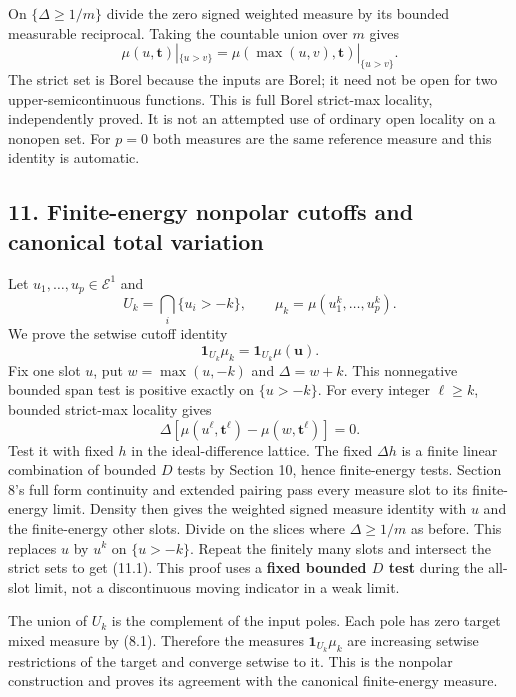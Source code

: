 \documentclass[
]{article}
\begin{document}
On \(\{\Delta\ge1/m\}\) divide the zero signed weighted measure by its
bounded measurable reciprocal. Taking the countable union over \(m\)
gives
\[\mu(u,\boldsymbol t)|_{\{u>v\}}=\mu(\max(u,v),\boldsymbol t)|_{\{u>v\}}.\tag{10.2}\]
The strict set is Borel because the inputs are Borel; it need not be
open for two upper-semicontinuous functions. This is full Borel
strict-max locality, independently proved. It is not an attempted use of
ordinary open locality on a nonopen set. For \(p=0\) both measures are
the same reference measure and this identity is automatic.

\subsection{11. Finite-energy nonpolar cutoffs and canonical total
variation}\label{finite-energy-nonpolar-cutoffs-and-canonical-total-variation}

Let \(u_1,\ldots,u_p\in\mathcal E^1\) and
\[U_k=\bigcap_i\{u_i>-k\},\qquad \mu_k=\mu(u_1^k,\ldots,u_p^k).\] We
prove the setwise cutoff identity
\[\mathbf1_{U_k}\mu_k=\mathbf1_{U_k}\mu(\boldsymbol u).\tag{11.1}\] Fix
one slot \(u\), put \(w=\max(u,-k)\) and \(\Delta=w+k\). This
nonnegative bounded span test is positive exactly on \(\{u>-k\}\). For
every integer \(\ell\ge k\), bounded strict-max locality gives
\[\Delta[\mu(u^\ell,\boldsymbol t^\ell)-\mu(w,\boldsymbol t^\ell)]=0.\]
Test it with fixed \(h\) in the ideal-difference lattice. The fixed
\(\Delta h\) is a finite linear combination of bounded \(D\) tests by
Section 10, hence finite-energy tests. Section 8's full form continuity
and extended pairing pass every measure slot to its finite-energy limit.
Density then gives the weighted signed measure identity with \(u\) and
the finite-energy other slots. Divide on the slices where
\(\Delta\ge1/m\) as before. This replaces \(u\) by \(u^k\) on
\(\{u>-k\}\). Repeat the finitely many slots and intersect the strict
sets to get (11.1). This proof uses a \textbf{fixed bounded \(D\) test}
during the all-slot limit, not a discontinuous moving indicator in a
weak limit.

The union of \(U_k\) is the complement of the input poles. Each pole has
zero target mixed measure by (8.1). Therefore the measures
\(\mathbf1_{U_k}\mu_k\) are increasing setwise restrictions of the
target and converge setwise to it. This is the nonpolar construction and
proves its agreement with the canonical finite-energy measure.
\end{document}
